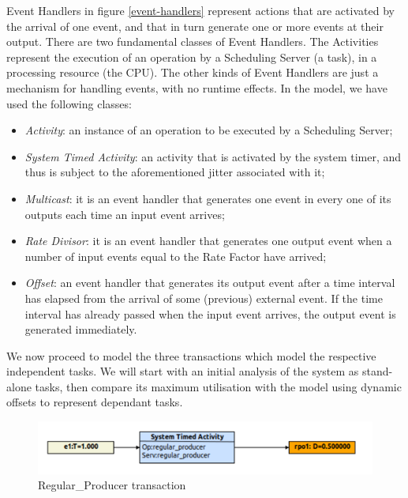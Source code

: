 \documentclass{article}
\begin{document}
Event Handlers in figure \ref{event-handlers} represent actions that are activated by the arrival of one event, and that in turn generate one or more events at their output. There are two fundamental classes of Event Handlers. The Activities represent the execution of an operation by a Scheduling Server (a task), in a processing resource (the CPU). The other kinds of Event Handlers are just a mechanism for handling events, with no runtime effects. In the model, we have used the following classes:

\begin{itemize}
   \item \textit{Activity}: an instance of an operation to be executed by a Scheduling Server;
   \item \textit{System Timed Activity}: an activity that is activated by the system timer, and thus is subject to the aforementioned jitter associated with it;
   \item \textit{Multicast}: it is an event handler that generates one event in every one of its outputs each time an input event arrives;
   \item \textit{Rate Divisor}: it is an event handler that generates one output event when a number of input events equal to the Rate Factor have arrived;
   \item \textit{Offset}: an event handler that generates its output event after a time interval has elapsed from the arrival of some (previous) external event. If the time interval has already passed when the input event arrives, the output event is generated immediately.
\end{itemize}

We now proceed to model the three transactions which model the respective independent tasks. We will start with an initial analysis of the system as stand-alone tasks, then compare its maximum utilisation with the model using dynamic offsets to represent dependant tasks.

\begin{figure}[!htbp]
\centering
\includegraphics[width=5in]{images/transaction-rp}
\caption{Regular\_Producer transaction}
\label{transaction-rp}
\end{figure}
\end{document}
